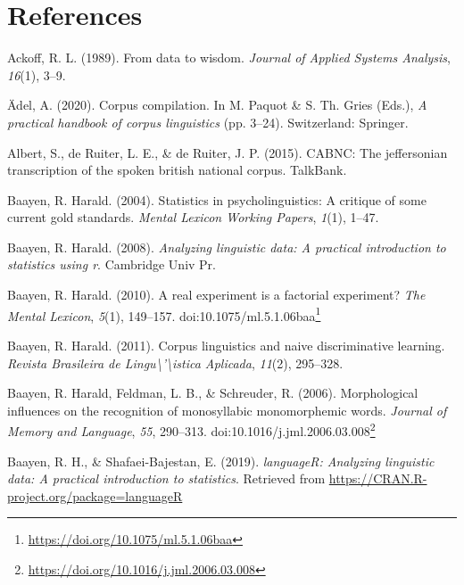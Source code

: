 \documentclass[
  letterpaper,
]{latex/krantz}
\newlength{\cslhangindent}
\newenvironment{CSLReferences}[2] %
 {\begin{list}{}{%
  \setlength{\itemindent}{0pt}
  \setlength{\leftmargin}{0pt}
  \setlength{\parsep}{0pt}
  \ifodd #1
   \setlength{\leftmargin}{\cslhangindent}
   \setlength{\itemindent}{-1\cslhangindent}
  \fi
  \setlength{\itemsep}{#2\baselineskip}}}
 {\end{list}}
\theoremstyle{definition}
\theoremstyle{remark}
\DeclareRobustCommand{\href}[2]{#2\footnote{\url{#1}}}
\begin{document}

\chapter*{References}\label{references}


\label{refs}
\begin{CSLReferences}{1}{0}
Ackoff, R. L. (1989). From data to wisdom. \emph{Journal of Applied
Systems Analysis}, \emph{16}(1), 3--9.

Ädel, A. (2020). Corpus compilation. In M. Paquot \& S. Th. Gries
(Eds.), \emph{A practical handbook of corpus linguistics} (pp. 3--24).
Switzerland: Springer.

Albert, S., de Ruiter, L. E., \& de Ruiter, J. P. (2015). CABNC: The
jeffersonian transcription of the spoken british national corpus.
TalkBank.

Baayen, R. Harald. (2004). Statistics in psycholinguistics: A critique
of some current gold standards. \emph{Mental Lexicon Working Papers},
\emph{1}(1), 1--47.

Baayen, R. Harald. (2008). \emph{Analyzing linguistic data: A practical
introduction to statistics using r}. Cambridge Univ Pr.

Baayen, R. Harald. (2010). A real experiment is a factorial experiment?
\emph{The Mental Lexicon}, \emph{5}(1), 149--157.
doi:\href{https://doi.org/10.1075/ml.5.1.06baa}{10.1075/ml.5.1.06baa}

Baayen, R. Harald. (2011). Corpus linguistics and naive discriminative
learning. \emph{Revista Brasileira de
Lingu{\textbackslash{}}'{\textbackslash{}}istica Aplicada},
\emph{11}(2), 295--328.

Baayen, R. Harald, Feldman, L. B., \& Schreuder, R. (2006).
Morphological influences on the recognition of monosyllabic
monomorphemic words. \emph{Journal of Memory and Language}, \emph{55},
290--313.
doi:\href{https://doi.org/10.1016/j.jml.2006.03.008}{10.1016/j.jml.2006.03.008}

Baayen, R. H., \& Shafaei-Bajestan, E. (2019). \emph{languageR:
Analyzing linguistic data: A practical introduction to statistics}.
Retrieved from \url{https://CRAN.R-project.org/package=languageR}


\end{CSLReferences}
\end{document}

